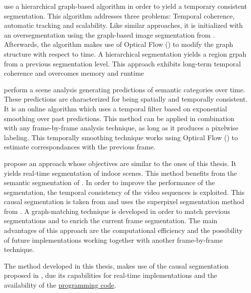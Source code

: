 \textcite{grundmann2010efficient} use a hierarchical graph-based algorithm in order to yield a temporary consistent segmentation. This algorithm addresses three problems: Temporal coherence, automatic tracking and scalability. Like similar approaches,  it is initialized with an oversegmentation using the graph-based image segmentation from \textcite{felzenszwalb2004efficient}. Afterwards, the algorithm makes use of Optical Flow (\textcite{horn1981determining}) to modify the graph structure with respect to time. A hierarchical segmentation yields a region grpah from a previous segmentation level.  This approach exhibits long-term temporal coherence and overcomes memory and runtime 

\textcite{miksik2013efficient} perform a scene analysis generating predictions of semantic categories over time. These predictions are characterized for being spatially and temporally consistent. It is an online algorithm which uses a temporal filter based on exponential smoothing over past predictions. This method can be applied in combination with any frame-by-frame analysis technique, as long as it produces a pixelwise labeling. This temporally smoothing technique works using Optical Flow (\textcite{horn1981determining}) to estimate correspondances with the previous frame.
  
\textcite{couprie2014convolutional} propose an approach whose objectives are similar to the ones of this thesis. It yields real-time segmentation of indoor scenes. This method benefits from the semantic segmentation of \textcite{farabet2013pami}. In order to improve the performance of the segmentation, the temporal consistency of the video sequences is exploited. This causal segmentation is taken from \textcite{couprie2013causal} and uses the superpixel segmentation method from \textcite{felzenszwalb2004efficient}. A graph-matching technique is developed in order to match previous segmentations and to enrich the current frame segmentation. The main advantages of this approach are the computational efficiency and the possibility of future implementations working together with another frame-by-frame technique.

The method developed in this thesis, makes use of the causal segmentation proposed in \textcite{couprie2013causal}, due its capabilities for real-time implementations and the availability of the \href{http://perso.esiee.fr/~coupriec/code.html}{programming code}. 



%
%
%

